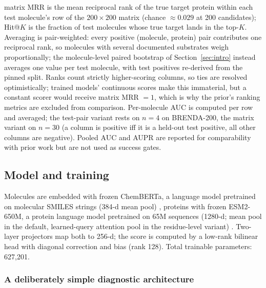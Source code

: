 \documentclass[11pt,a4paper]{article}
\newcommand{\mrr}{matrix MRR}
\begin{document}
\mrr{} is the mean reciprocal rank of the true target protein within each
test molecule's row of the $200\times200$ matrix (chance $\approx 0.029$
at 200 candidates); Hit@$K$ is the fraction of test molecules whose true
target lands in the top-$K$. Averaging is pair-weighted: every positive
(molecule, protein) pair contributes one reciprocal rank, so molecules with
several documented substrates weigh proportionally; the molecule-level
paired bootstrap of Section~\ref{sec:intro} instead averages one value per
test molecule, with test positives re-derived from the pinned split.
Ranks count strictly higher-scoring columns,
so ties are resolved optimistically; trained models' continuous scores make
this immaterial, but a constant scorer would receive \mrr{} $=1$, which is
why the prior's ranking metrics are excluded from comparison.
Per-molecule AUC is computed per row and
averaged; the test-pair variant rests on $n=4$ on BRENDA-200, the matrix
variant on $n=30$ (a column is positive iff it is a held-out test positive,
all other columns are negative). Pooled AUC and AUPR are reported for
comparability with prior work but are not used as success gates.

\subsection{Model and training}
\label{sec:model}

Molecules are embedded with frozen ChemBERTa, a language model pretrained
on molecular SMILES strings (384-d mean pool)
\citep{chithrananda2020chemberta}, proteins with frozen ESM2-650M, a
protein language model pretrained on 65M sequences (1280-d; mean pool in the
default, learned-query attention pool in the residue-level
variant) \citep{lin2023esm2}. Two-layer projectors map both to 256-d; the
score is computed by a low-rank bilinear head with diagonal correction and
bias (rank 128). Total trainable parameters: 627{,}201.

\subsubsection{A deliberately simple diagnostic architecture}
\label{sec:simplearch}
\end{document}
